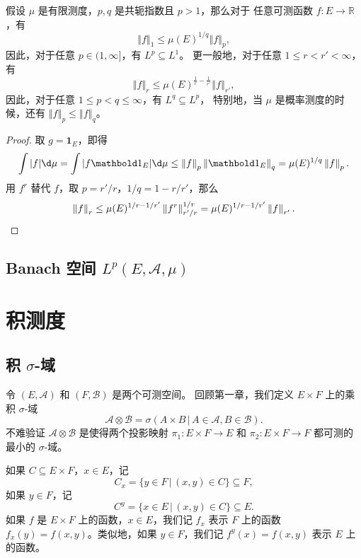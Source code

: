 \documentclass[fontset=none]{Notes}
\newcommand{\indicator}[1]{\mathbold 1_{#1}}
\newcommand{\norm}[1]{\left\Vert#1\right\Vert}
\begin{document}
\begin{corollary}
  假设 $\mu$ 是有限测度，$p,q$ 是共轭指数且 $p>1$，那么对于
  任意可测函数 $f:E\to \mathbb{R}$，有
  \[
    \norm{f}_1\leq \mu(E)^{1/q}\norm{f}_p,  
  \]
  因此，对于任意 $p\in (1,\infty]$，有 $L^p\subseteq L^1$。
  更一般地，对于任意 $1\leq r< r'<\infty$，有
  \[
    \norm{f}_r\leq \mu(E)^{\frac{1}{r}-\frac{1}{r'}}  
    \norm{f}_{r'},
  \]
  因此，对于任意 $1\leq p<q\leq \infty$，有 $L^q\subseteq L^p$，
  特别地，当 $\mu$ 是概率测度的时候，还有 $\norm{f}_p\leq\norm{f}_q$。
\end{corollary}
\begin{proof}
  取 $g=\indicator{E}$，即得
  \[
    \int|f|\d\mu=\int|f \indicator{E}|\d\mu\leq
    \norm{f}_p \norm{\indicator{E}}_q=\mu(E)^{1/q}\norm{f}_p. 
  \]
  用 $f^r$ 替代 $f$，取 $p=r'/r$，$1/q=1-r/r'$，那么
  \[
    \norm{f}_r\leq \mu(E)^{1/r-1/r'}\norm{f^r}_{r'/r}^{1/r}  
    =\mu(E)^{1/r-1/r'}\norm{f}_{r'}.\qedhere
  \]
\end{proof}

\section{Banach 空间 $L^p(E,\mathcal{A},\mu)$}



\chapter{积测度}

\section{积 $\sigma$-域}

令 $(E,\mathcal{A})$ 和 $(F,\mathcal{B})$ 是两个可测空间。
回顾第一章，我们定义 $E\times F$ 上的乘积 $\sigma$-域
\[
  \mathcal{A}\otimes \mathcal{B}=\sigma(A\times B\,|\, A\in \mathcal{A},B\in \mathcal{B}).  
\]
不难验证 $\mathcal{A}\otimes \mathcal{B}$ 是使得两个投影映射
$\pi_1:E\times F\to E$ 和 $\pi_2:E\times F\to F$ 都可测的最小的
$\sigma$-域。

如果 $C\subseteq E\times F$，$x\in E$，记
\[
  C_x=\{y\in F\,|\, (x,y)\in C\}\subseteq F,  
\]
如果 $y\in F$，记
\[
  C^y=\{x\in E\,|\, (x,y)\in C\}  \subseteq E.
\]
如果 $f$ 是 $E\times F$ 上的函数，$x\in E$，我们记 $f_x$ 表示
$F$ 上的函数 $f_x(y)=f(x,y)$。类似地，如果 $y\in F$，我们记
$f^y(x)=f(x,y)$ 表示 $E$ 上的函数。
\end{document}
